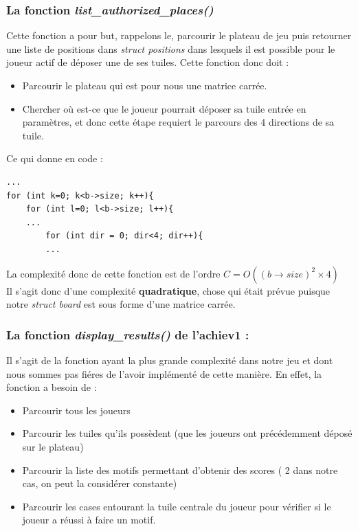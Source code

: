 \documentclass[12pt,a4paper]{extarticle}
\begin{document}
    \subsubsection{La fonction \emph{list\_authorized\_places()}}
    Cette fonction a pour but, rappelons le, parcourir le plateau de jeu puis retourner une liste de positions dans \emph{struct positions} 
    dans lesquels il est possible pour le joueur actif de d\'eposer une de ses tuiles.
    Cette fonction donc doit :
    \begin{itemize}
        \item Parcourir le plateau qui est pour nous une matrice carr\'ee.
        \item Chercher o\`u est-ce que le joueur pourrait d\'eposer sa tuile entr\'ee en param\`etres, et donc cette \'etape 
        requiert le parcours des 4 directions de sa tuile.
    \end{itemize}
    Ce qui donne en code :
    \begin{lstlisting}[style=CStyle]
...
for (int k=0; k<b->size; k++){
    for (int l=0; l<b->size; l++){
    ...
        for (int dir = 0; dir<4; dir++){
        ... \end{lstlisting}
    La complexit\'e donc de cette fonction est de l'ordre \( C = O((b\rightarrow size)^2 \times 4)\)
    \\ Il s'agit donc d'une complexit\'e \textbf{quadratique}, chose qui \'etait pr\'evue puisque notre \emph{struct board} 
    est sous forme d'une matrice carr\'ee.


    \subsubsection{La fonction \emph{display\_results()} de l'achiev1 :}
    Il s'agit de la fonction ayant la plus grande complexit\'e dans notre jeu et dont nous sommes pas fi\'eres de l'avoir 
    impl\'ement\'e de cette mani\`ere.
    En effet, la fonction a besoin de : 
    \begin{itemize}
        \item Parcourir tous les joueurs
        \item Parcourir les tuiles qu'ils poss\`edent (que les joueurs ont pr\'ec\'edemment d\'epos\'e sur le plateau)
        \item Parcourir la liste des motifs permettant d'obtenir des scores ( 2 dans notre cas, on peut la consid\'erer constante)
        \item Parcourir les cases entourant la tuile centrale du joueur pour v\'erifier si le joueur a r\'eussi \`a faire un motif.
    \end{itemize}
\end{document}
